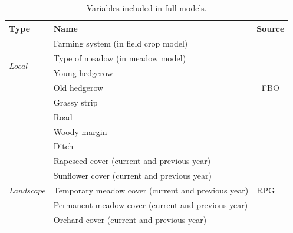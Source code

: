 \documentclass[smallextended]{svjour3}       %
\begin{document}
\begin{table}[H]
\caption{Variables included in full models.}
\begin{center}
\begin{tabular}{lll}
\toprule
\textbf{Type}                          & \textbf{Name}                                      & \textbf{Source}                                   \\ \hline
\multirow{4}{*}{\textit{Local}}        & Farming system (in field crop model)               & \multicolumn{1}{c}{\multirow{7}{*}{FBO}} \\
                                       & Type of meadow (in meadow model)                   & \multicolumn{1}{c}{}                     \\
                                       & Young hedgerow                                     & \multicolumn{1}{c}{}                     \\
                                       & Old hedgerow                                       & \multicolumn{1}{c}{}                     \\
\textit{}                              & Grassy strip                                       & \multicolumn{1}{c}{}                     \\
\textit{}                              & Road                                               & \multicolumn{1}{c}{}                     \\
\textit{}                              & Woody margin                                       & \multicolumn{1}{c}{}                     \\
\textit{}                              & Ditch                                              &                                          \\ \hline
\multirow{6}{*}{\textit{Landscape}}    & Rapeseed cover (current and previous year)         & \multirow{5}{*}{RPG}                     \\
                                       & Sunflower cover (current and previous year)        &                                          \\
                                       & Temporary meadow cover (current and previous year) &                                          \\
                                       & Permanent meadow cover (current and previous year) &                                          \\
                                       & Orchard cover (current and previous year)          &                                          \\

\end{tabular}
\end{center}
\end{table}
\end{document}
